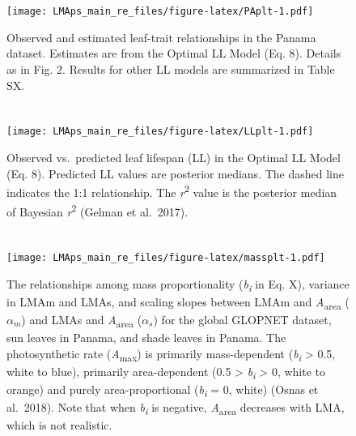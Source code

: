 \documentclass[
  12pt,
]{article}
\begin{document}
\newpage

\hypertarget{section-3}{%
\section{}\label{section-3}}

\begin{figure}
\centering
\texttt{[image: LMAps\_main\_re\_files/figure-latex/PAplt-1.pdf]}
\caption{\label{fig:PAplt}Observed and estimated leaf-trait relationships in the Panama dataset. Estimates are from the Optimal LL Model (Eq. 8). Details as in Fig. 2. Results for other LL models are summarized in Table SX.}
\end{figure}

\newpage

\hypertarget{section-4}{%
\section{}\label{section-4}}

\begin{figure}
\centering
\texttt{[image: LMAps\_main\_re\_files/figure-latex/LLplt-1.pdf]}
\caption{\label{fig:LLplt}Observed vs.~predicted leaf lifespan (LL) in the Optimal LL Model (Eq. 8). Predicted LL values are posterior medians. The dashed line indicates the 1:1 relationship. The \emph{r}\textsuperscript{2} value is the posterior median of Bayesian \emph{r}\textsuperscript{2} (Gelman et al.~2017).}
\end{figure}

\newpage

\hypertarget{section-5}{%
\section{}\label{section-5}}

\begin{figure}
\centering
\texttt{[image: LMAps\_main\_re\_files/figure-latex/massplt-1.pdf]}
\caption{\label{fig:massplt}The relationships among mass proportionality (\emph{b\textsubscript{i}} in Eq. X), variance in LMAm and LMAs, and scaling slopes between LMAm and \emph{A}\textsubscript{area} (\(\alpha_m\)) and LMAs and \emph{A}\textsubscript{area} (\(\alpha_s\)) for the global GLOPNET dataset, sun leaves in Panama, and shade leaves in Panama. The photosynthetic rate (\emph{A}\textsubscript{max}) is primarily mass-dependent (\emph{b\textsubscript{i}} \textgreater{} 0.5, white to blue), primarily area-dependent (0.5 \textgreater{} \emph{b\textsubscript{i}} \textgreater{} 0, white to orange) and purely area-proportional (\emph{b\textsubscript{i}} = 0, white) (Osnas et al.~2018). Note that when \emph{b\textsubscript{i}} is negative, \emph{A}\textsubscript{area} decreases with LMA, which is not realistic.}
\end{figure}
\end{document}
